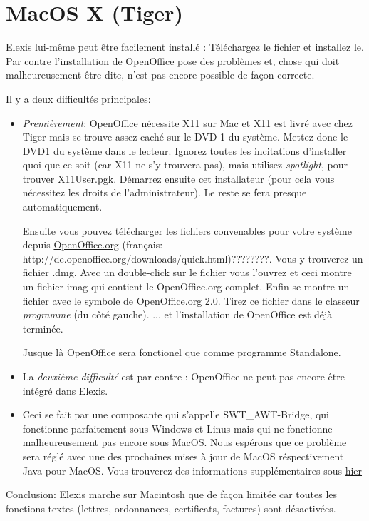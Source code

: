 \section{MacOS X (Tiger) }
Elexis lui-même peut être facilement installé : Téléchargez le fichier et installez le. Par contre l'installation de OpenOffice pose des problèmes et, chose qui doit malheureusement être dite, n'est pas encore possible de façon correcte.

Il y a deux difficultés principales:
\begin{itemize}
 \item

 \textit{Premièrement}: OpenOffice nécessite X11 sur Mac et X11 est livré avec chez Tiger mais se trouve assez caché sur le DVD 1 du système. Mettez donc le DVD1 du système dans le lecteur. Ignorez toutes les incitations d'installer quoi que ce soit (car X11 ne s'y trouvera pas), mais utilisez \textit{spotlight}, pour trouver X11User.pgk.  Démarrez ensuite cet installateur (pour cela vous nécessitez les droits de l'administrateur). Le reste se fera presque automatiquement.

Ensuite vous pouvez télécharger les fichiers convenables pour votre système depuis \href{http://www.openoffice.org}{OpenOffice.org} (français: http://de.openoffice.org/downloads/quick.html)????????. Vous y trouverez un fichier  .dmg. Avec un double-click sur le fichier vous l'ouvrez et ceci montre un fichier imag qui contient le OpenOffice.org complet. Enfin se montre un fichier avec le symbole de OpenOffice.org 2.0. Tirez ce fichier dans le classeur \textit{programme} (du côté gauche). ... et l'installation de OpenOffice est déjà terminée.

Jusque là OpenOffice sera fonctionel que comme programme Standalone.

\item La  \textit{deuxième difficulté} est par contre : OpenOffice ne peut pas encore être intégré dans Elexis.
\item  Ceci se fait par une composante qui s'appelle SWT\_AWT-Bridge, qui fonctionne parfaitement sous Windows et Linus mais qui ne fonctionne malheureusement pas encore sous MacOS. Nous espérons que ce problème sera réglé avec une des prochaines mises à jour de MacOS réspectivement Java pour MacOS. Vous trouverez des informations supplémentaires sous  \href{https://bugs.eclipse.org/bugs/show_bug.cgi?id=67384}{hier}
\end{itemize}

Conclusion: Elexis marche sur Macintosh que de façon limitée car toutes les fonctions textes (lettres, ordonnances, certificats, factures) sont désactivées.
